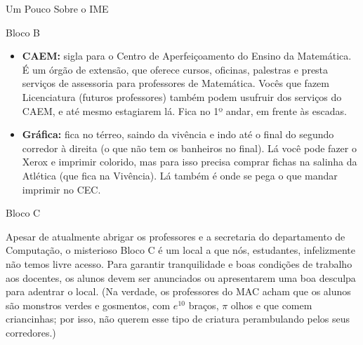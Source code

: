 \begin{secao}{Um Pouco Sobre o IME}
\begin{subsecao}{Bloco B}
\begin{itemize}
A Seção de Alunos fica na sala 12, ao lado do CEC e das mesas azuis.
\begin{itemize}
\item[-] Horário de atendimento: 10:00 às 13:00 e 17:00 às 20:00, de segunda a sexta.
\item[-] E-mail: \tt{saol@ime.usp.br}
\item[-] Telefone: \tt{11 3091-6149} e \tt{11 3091-6279}
\end{itemize}

\item {\bf CAEM:} sigla para o Centro de Aperfeiçoamento do Ensino da
  Matemática. É um órgão de extensão, que oferece cursos, oficinas, palestras e
  presta serviços de assessoria para professores de Matemática. Vocês que fazem
  Licenciatura (futuros professores) também podem usufruir dos serviços do CAEM,
  e até mesmo estagiarem lá. Fica no 1º andar, em frente às escadas.

\item{\bf Gráfica:} fica no térreo, saindo da vivência e indo até o final do segundo
  corredor à direita (o que não tem os banheiros no final). Lá você pode fazer o Xerox e imprimir colorido, mas para isso precisa comprar fichas na salinha da Atlética (que fica na Vivência). Lá também é onde se pega o que mandar imprimir no CEC.
\end{itemize}

\end{subsecao}






\begin{subsecao}{Bloco C}

Apesar de atualmente abrigar os professores e a secretaria do departamento de
Computação, o misterioso Bloco C é um local a que nós, estudantes, infelizmente não
temos livre acesso. Para garantir tranquilidade e boas condições de trabalho aos
docentes, os alunos devem ser anunciados ou apresentarem uma boa desculpa para
adentrar o local. (Na verdade, os professores do MAC acham que os alunos são monstros
verdes e gosmentos, com $e^{10}$ braços, $\pi$ olhos e que comem criancinhas;
por isso, não querem esse tipo de criatura perambulando pelos seus corredores.)

\end{subsecao}


\end{secao}

